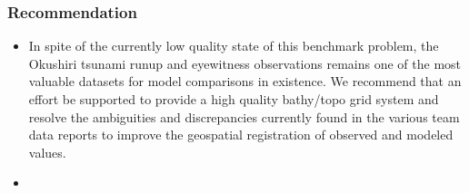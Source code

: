 \subsubsection{Recommendation}
\begin{itemize}
\item In spite of the currently low quality state of this benchmark problem, the Okushiri tsunami runup and eyewitness observations remains one of the most valuable datasets for model comparisons in existence.  We recommend that an effort be supported to provide a high quality bathy/topo grid system and resolve the ambiguities and discrepancies currently found in the various team data reports to improve the geospatial registration of observed and modeled values.
\end{itemize}



\begin{itemize}
\item 
\end{itemize}